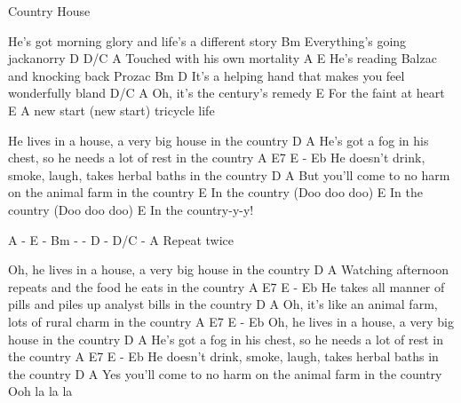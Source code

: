 \begin{song}{Country House}{
	
	\chordset[Verse]{ \AMaj \EMaj \Bm \DMaj \DMajBassCsh }

	\chordset[Chorus]{ \AMajShE \ESevenShA \EMajShA \DshShA \DMajShA}
	\vspace{1em}
}
\begin{songverse}
He's got morning glory and life's a different story
Bm 
Everything's going jackanorry
D                 D/C          A
Touched with his own mortality
     A                  E 
He's reading Balzac and knocking back Prozac
       Bm                                           D
It's a helping hand that makes you feel wonderfully bland
             D/C            A  
Oh, it's the century's remedy
        E 
For the faint at heart
  E 
A new start (new start) {tricycle life}

 \end{songverse}
 
\begin{songchorus}                                 

He lives in a house, a very big house in the country 
           D                                                  A
He's got a fog in his chest, so he needs a lot of rest in the country
           A                                              E7       E - Eb 
He doesn't drink, smoke, laugh, takes herbal baths in the country 
                   D                                  A
But you'll come to no harm on the animal farm in the country 
E
In the country (Doo doo doo)
E 
In the country (Doo doo doo)
E 
In the country-y-y! 

\end{songchorus}

\begin{songverse*}
 A - E - Bm - - D - D/C - A  Repeat twice
 \end{songverse*}

\begin{songchorus}[Chorus 1 \& 2]
Oh, he lives in a house, a very big house in the country
         D                                             A         
Watching afternoon repeats and the food he eats in the country
             A                                                 E7      E - Eb 
He takes all manner of pills and piles up analyst bills in the country 
                 D                                       A
Oh, it's like an animal farm, lots of rural charm in the country 
       A                                         E7       E - Eb
Oh, he lives in a house, a very big house in the country
           D                                                  A 
He's got a fog in his chest, so he needs a lot of rest in the country 
           A                                              E7       E - Eb
He doesn't drink, smoke, laugh, takes herbal baths in the country
                      D                              A 
Yes you'll come to no harm on the animal farm in the country 
Ooh la la la
	
\end{songchorus}




\end{song}